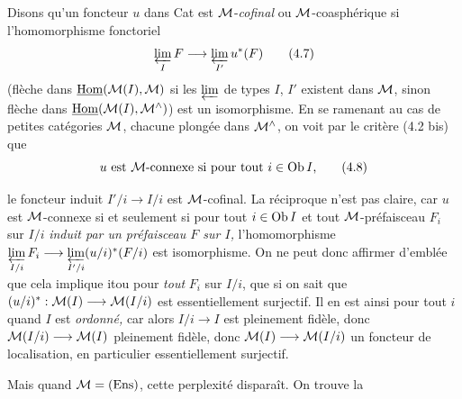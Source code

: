 Disons qu'un foncteur $u$ dans Cat est $\mathcal{M}$-\textit{cofinal} ou $\mathcal{M}$-coasphérique si l'homomorphisme fonctoriel
\[
\varprojlim_{I} F \longrightarrow \varprojlim_{I'} u^*(F)
\tag*{(4.7)}
\]
(flèche dans $\underline{\operatorname{Hom}}(\mathcal{M}(I), \mathcal{M})$ si les $\varprojlim$ de types $I$, $I'$ existent dans $\mathcal{M}$, sinon flèche dans $\underline{\operatorname{Hom}}(\mathcal{M}(I), \mathcal{M}^\wedge)$) est un isomorphisme. En se ramenant au cas de petites catégories $\mathcal{M}$, chacune plongée dans $\mathcal{M}^\wedge$, on voit par le critère (4.2 bis) que
\[
\text{$u$ est $\mathcal{M}$-connexe si pour tout $i \in \operatorname{Ob} I$,}
\tag*{(4.8)}
\]

le foncteur induit $I'/i \longrightarrow I/i$ est $\mathcal{M}$-cofinal. La réciproque n'est pas claire, car $u$ est $\mathcal{M}$-connexe si et seulement si pour tout $i \in \operatorname{Ob} I$ et tout $\mathcal{M}$-préfaisceau $F_i$ sur $I/i$ \textit{induit par un préfaisceau $F$ sur $I$,} l'homomorphisme $\varprojlim\limits_{I/i} F_i \longrightarrow \varprojlim\limits_{I'/i} (u/i)^*(F/i)$ est isomorphisme. On ne peut donc affirmer d'emblée que cela implique itou pour \textit{tout} $F_i$ sur $I/i$, que si on sait que $(u/i)^* : \mathcal{M}(I) \longrightarrow \mathcal{M}(I/i)$ est essentiellement surjectif. Il en est ainsi pour tout $i$ quand $I$ est \textit{ordonné,} car alors $I/i \longrightarrow I$ est pleinement fidèle, donc $\mathcal{M}(I/i) \longrightarrow \mathcal{M}(I)$ pleinement fidèle, donc $\mathcal{M}(I) \longrightarrow \mathcal{M}(I/i)$ un foncteur de localisation, en particulier essentiellement surjectif.

Mais quand $\mathcal{M} = (\text{Ens})$, cette perplexité disparaît. On trouve la

